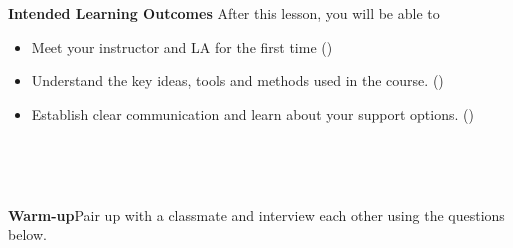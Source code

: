 \documentclass[10pt]{article}
\begin{document}
\pagestyle{otherpages}
\thispagestyle{firstpage}




\textbf{Intended Learning Outcomes}
After this lesson, you will be able to 

\begin{itemize}
    \item Meet your instructor and LA for the first time ()
    \item Understand the key ideas, tools and methods used in the course. ()
    \item Establish clear communication and learn about your support options. ()
\end{itemize}

\vspace{-0.5cm}

\hrulefill

\,



\\

\newpage 



{\bf\color{blue}Warm-up}\exercise {}Pair up with a classmate and interview each other using the questions below. \\
\end{document}
